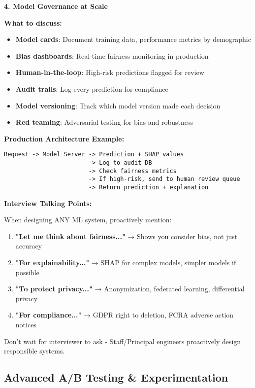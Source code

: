 \documentclass[10pt]{article}
\begin{document}
\textbf{4. Model Governance at Scale}

\textbf{What to discuss:}
\begin{itemize}
\item \textbf{Model cards}: Document training data, performance metrics by demographic
\item \textbf{Bias dashboards}: Real-time fairness monitoring in production
\item \textbf{Human-in-the-loop}: High-risk predictions flagged for review
\item \textbf{Audit trails}: Log every prediction for compliance
\item \textbf{Model versioning}: Track which model version made each decision
\item \textbf{Red teaming}: Adversarial testing for bias and robustness
\end{itemize}

\textbf{Production Architecture Example:}
\begin{verbatim}
Request -> Model Server -> Prediction + SHAP values
                        -> Log to audit DB
                        -> Check fairness metrics
                        -> If high-risk, send to human review queue
                        -> Return prediction + explanation
\end{verbatim}

\textbf{Interview Talking Points:}

When designing ANY ML system, proactively mention:
\begin{enumerate}
\item \textbf{"Let me think about fairness..."} → Shows you consider bias, not just accuracy
\item \textbf{"For explainability..."} → SHAP for complex models, simpler models if possible
\item \textbf{"To protect privacy..."} → Anonymization, federated learning, differential privacy
\item \textbf{"For compliance..."} → GDPR right to deletion, FCRA adverse action notices
\end{enumerate}

Don't wait for interviewer to ask - Staff/Principal engineers proactively design responsible systems.

\subsection{Advanced A/B Testing \& Experimentation}
\end{document}
